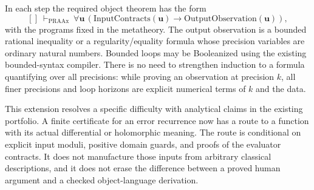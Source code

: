 In each step the required object theorem has the form
\[
 []\ \vdash_{\mathrm{PRAAx}}\
 \forall\mathbf u\,
   (\mathrm{InputContracts}(\mathbf u)\to
    \mathrm{OutputObservation}(\mathbf u)),
\]
with the programs fixed in the metatheory.  The output observation is a bounded rational inequality or a regularity/equality formula whose precision variables are ordinary natural numbers.  Bounded loops may be Booleanized using the existing bounded-syntax compiler.  There is no need to strengthen induction to a formula quantifying over all precisions: while proving an observation at precision $k$, all finer precisions and loop horizons are explicit numerical terms of $k$ and the data.

This extension resolves a specific difficulty with analytical claims in the existing portfolio.  A finite certificate for an error recurrence now has a route to a function with its actual differential or holomorphic meaning.  The route is conditional on explicit input moduli, positive domain guards, and proofs of the evaluator contracts.  It does not manufacture those inputs from arbitrary classical descriptions, and it does not erase the difference between a proved human argument and a checked object-language derivation.
